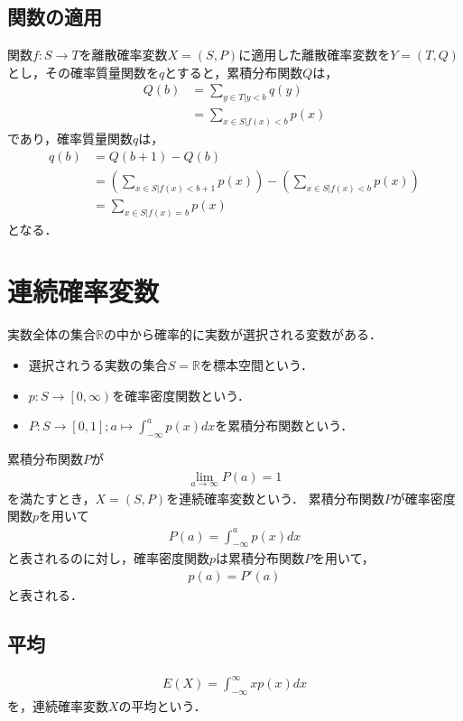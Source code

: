 \documentclass[dvipdfmx]{jsarticle}
\begin{document}
 \subsection{関数の適用}
関数$f:S\to T$を離散確率変数$X=\left(S,P\right)$に適用した離散確率変数を$Y=\left(T,Q\right)$とし，その確率質量関数を$q$とすると，累積分布関数$Q$は，
 \begin{align}
Q\left(b\right)&=\sum_{y\in T|y<b}q\left(y\right)\nonumber\\
&=\sum_{x\in S|f\left(x\right)<b}p\left(x\right)
 \end{align}
であり，確率質量関数$q$は，
 \begin{align}
q\left(b\right)&=Q\left(b+1\right)-Q\left(b\right)\nonumber\\
&=\left(\sum_{x\in S|f\left(x\right)<b+1}p\left(x\right)\right)-\left(\sum_{x\in S|f\left(x\right)<b}p\left(x\right)\right)\nonumber\\
&=\sum_{x\in S|f\left(x\right)=b}p\left(x\right)
 \end{align}
となる．
 \section{連続確率変数}
実数全体の集合$\mathbb{R}$の中から確率的に実数が選択される変数がある．
 \begin{itemize}
  \item 選択されうる実数の集合$S=\mathbb{R}$を標本空間という．
  \item $p:S\to\left[0,\infty\right)$を確率密度関数という．
  \item $P:S\to\left[0,1\right];a\mapsto\int_{-\infty}^ap\left(x\right)dx$を累積分布関数という．
 \end{itemize}
累積分布関数$P$が
 \begin{align}
\lim_{a\to\infty}P\left(a\right)=1
 \end{align}
を満たすとき，$X=\left(S,P\right)$を連続確率変数という．
累積分布関数$P$が確率密度関数$p$を用いて
 \begin{align}
P\left(a\right)=\int_{-\infty}^ap\left(x\right)dx
 \end{align}
と表されるのに対し，確率密度関数$p$は累積分布関数$P$を用いて，
 \begin{align}
p\left(a\right)=P'\left(a\right)
 \end{align}
と表される．
 \subsection{平均}
 \begin{align}
E\left(X\right)=\int_{-\infty}^\infty xp\left(x\right)dx
 \end{align}
を，連続確率変数$X$の平均という．
\end{document}
